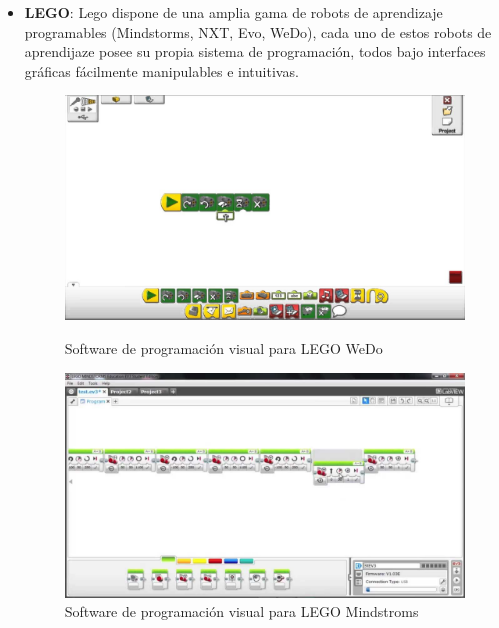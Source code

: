 \begin{itemize}
\item \textbf{LEGO}: Lego dispone de una amplia gama de robots de aprendizaje programables (Mindstorms, NXT, Evo, WeDo), cada uno de estos robots de aprendijaze posee su propia sistema de programación, todos bajo interfaces gráficas fácilmente manipulables e intuitivas.\\
\begin{figure}[H]
	\begin{minipage}{0.48\textwidth}
    	\centering
     	\includegraphics[scale=0.15]{img/lego-wedo.jpg}
  		\caption{Software de programación visual para LEGO WeDo}
  		\label{fig:lego-wedo}
   	\end{minipage}\hfill
   	\begin {minipage}{0.48\textwidth}
     	\centering
     	\includegraphics[scale=0.15]{img/lego-mindstorms.jpg}
     	\caption{Software de programación visual para LEGO Mindstroms}
     	\label{fig:lego-mindstorms}
	\end{minipage}
\end{figure}


\end{itemize}
